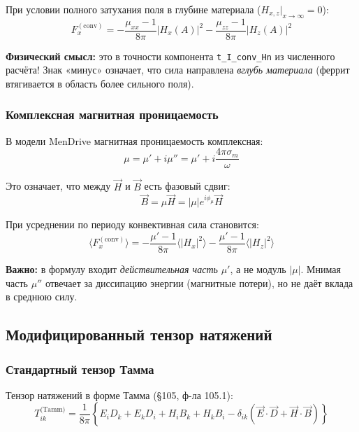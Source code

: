 \documentclass[a4paper,12pt]{article}
\begin{document}
При условии полного затухания поля в глубине материала ($H_{x,z}|_{x\to\infty} = 0$):
\begin{equation}
\boxed{
F_x^{(\text{conv})} = -\frac{\mu_{xx} - 1}{8\pi}|H_x(A)|^2 - \frac{\mu_{zz} - 1}{8\pi}|H_z(A)|^2
}
\label{eq:conv_final}
\end{equation}

\textbf{Физический смысл:} это в точности компонента \texttt{t\_I\_conv\_Hn} из численного расчёта! Знак «минус» означает, что сила направлена \textit{вглубь материала} (феррит втягивается в область более сильного поля).

\subsubsection{Комплексная магнитная проницаемость}

В модели MenDrive магнитная проницаемость комплексная:
\begin{equation}
\mu = \mu' + i\mu'' = \mu' + i\frac{4\pi\sigma_m}{\omega}
\label{eq:complex_mu}
\end{equation}

Это означает, что между $\vec{H}$ и $\vec{B}$ есть фазовый сдвиг:
\begin{equation}
\vec{B} = \mu\vec{H} = |\mu|e^{i\phi_\mu}\vec{H}
\label{eq:phase_shift}
\end{equation}

При усреднении по периоду конвективная сила становится:
\begin{equation}
\langle F_x^{(\text{conv})}\rangle = -\frac{\mu' - 1}{8\pi}\langle|H_x|^2\rangle - \frac{\mu' - 1}{8\pi}\langle|H_z|^2\rangle
\label{eq:conv_averaged}
\end{equation}

\textbf{Важно:} в формулу входит \textit{действительная часть} $\mu'$, а не модуль $|\mu|$. Мнимая часть $\mu''$ отвечает за диссипацию энергии (магнитные потери), но не даёт вклада в среднюю силу.

\subsection{Модифицированный тензор натяжений}

\subsubsection{Стандартный тензор Тамма}

Тензор натяжений в форме Тамма (\S 105, ф-ла 105.1):
\begin{equation}
T_{ik}^{\text{(Tamm)}} = \frac{1}{8\pi}\left\{E_i D_k + E_k D_i + H_i B_k + H_k B_i - \delta_{ik}(\vec{E}\cdot\vec{D} + \vec{H}\cdot\vec{B})\right\}
\label{eq:tamm_tensor}
\end{equation}
\end{document}
